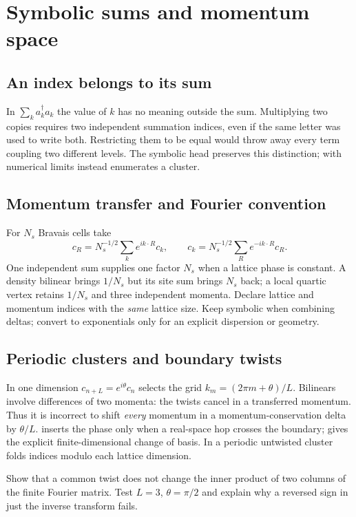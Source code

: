 \chapter{Symbolic sums and momentum space}
\section{An index belongs to its sum}
In $\sum_k a_k^\dagger a_k$ the value of $k$ has no meaning outside
the sum. Multiplying two copies requires two independent summation
indices, even if the same letter was used to write both. Restricting
them to be equal would throw away every term coupling two different
levels. The symbolic head  preserves this distinction;
 with numerical limits instead enumerates a cluster.

\section{Momentum transfer and Fourier convention}
For $N_s$ Bravais cells take
\[
 c_R=N_s^{-1/2}\sum_k e^{ik\cdot R}c_k,\qquad
 c_k=N_s^{-1/2}\sum_R e^{-ik\cdot R}c_R .
\]
One independent sum supplies one factor $N_s$ when a lattice phase
is constant. A density bilinear brings $1/N_s$ but its site sum brings
$N_s$ back; a local quartic vertex retains $1/N_s$ and three independent
momenta. Declare lattice and momentum indices with the \emph{same}
lattice size. Keep  symbolic when combining deltas;
convert to exponentials only for an explicit dispersion or geometry.

\section{Periodic clusters and boundary twists}
In one dimension $c_{n+L}=e^{i\theta}c_n$ selects the grid
$k_m=(2\pi m+\theta)/L$. Bilinears involve differences of two
momenta: the twists cancel in a transferred momentum. Thus it is
incorrect to shift \emph{every} momentum in a momentum-conservation
delta by $\theta/L$.  inserts the phase only when a
real-space hop crosses the boundary;  gives the
explicit finite-dimensional change of basis. In a periodic untwisted
cluster  folds indices modulo each lattice dimension.
\begin{exercise}\label{ex:grid}
Show that a common twist does not change the inner product of two
columns of the finite Fourier matrix. Test $L=3$, $\theta=\pi/2$ and
explain why a reversed sign in just the inverse transform fails.
\end{exercise}
